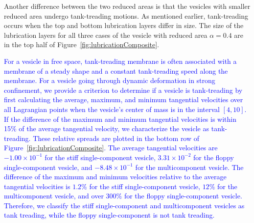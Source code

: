 \documentclass[twoside,twocolumn,9pt]{article}
\begin{document}
Another difference between the two reduced areas is that the vesicles
with smaller reduced area undergo tank-treading motions. As mentioned
earlier, tank-treading occurs when the top and bottom lubrication layers
differ in size. The size of the lubrication layers for all three cases
of the vesicle with reduced area $\alpha = 0.4$ are in the top half of
Figure~\ref{fig:lubricationComposite}. 


\textcolor{blue}
{For a vesicle in free space, tank-treading membrane is often associated with a membrane of a steady shape and a constant tank-treading speed along the membrane.
For a vesicle going through dynamic deformation in strong confinement, we provide a criterion to determine if a vesicle is tank-treading 
by first calculating
the average, maximum, and minimum tangential velocities over all
Lagrangian points when the vesicle's center of mass is in the interval
$[4,10]$. If the difference of the maximum and minimum tangential
velocities is within 15\% of the average tangential velocity, we
characterize the vesicle as tank-treading. These relative spreads are
plotted in the bottom row of Figure~\ref{fig:lubricationComposite}. The
average tangential velocities are $-1.00 \times 10^{-1}$ for the stiff
single-component vesicle, $3.31 \times 10^{-2}$ for the floppy
single-component vesicle, and $-8.48 \times 10^{-1}$ for the
multicomponent vesicle. The difference of the maximum and minimum
velocities relative to the average tangential velocities is $1.2\%$ for
the stiff single-component vesicle, $12\%$ for the multicomponent
vesicle, and over $300\%$ for the floppy single-component vesicle.
Therefore, we classify the stiff single-component and multicomponent
vesicles as tank treading, while the floppy single-component is not tank
treading.}
\end{document}
